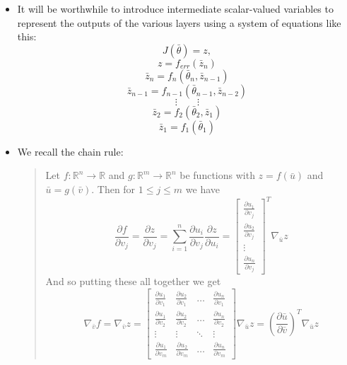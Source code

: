 \documentclass{article}
\begin{document}
\begin{itemize}
\item It will be worthwhile to introduce intermediate scalar-valued variables to represent the outputs of the various layers using a system of equations like this:
$$J(\bar{\theta})  = z,$$
$$ z = f_{err}(\bar{z}_{n})$$ 
$$\bar{z}_{n} = f_{n}(\bar{\theta}_{n}, \bar{z}_{n-1})$$  
$$\bar{z}_{n-1}=  f_{n-1}(\bar{\theta}_{n-1}, \bar{z}_{n-2}) $$ 
$$ \vdots  \qquad \vdots$$
$$  \bar{z}_{2}= f_{2}(\bar{\theta}_{2}, \bar{z}_{1}) $$ 
$$  \bar{z}_{1}= f_{1}(\bar{\theta}_{1}) $$ 

\item We recall the chain rule:
\begin{quote} Let $f:\mathbb{R}^{n} \rightarrow \mathbb{R}$ and $g:\mathbb{R}^{m}\rightarrow \mathbb{R}^{n}$ be functions with $z= f(\bar{u})$ and $\bar{u} = g(\bar{v})$.  Then for
$1 \leq j \leq m$ we have
$$\frac{\partial f}{\partial v_{j}} = \frac{\partial z}{\partial v_{j}} = \sum_{i = 1}^{n} \frac{\partial u_{i}}{\partial v_{j}}\frac{\partial z}{\partial u_{i}} = 
\left[ \begin{array}{c}
\frac{\partial u_{1}}{\partial v_{j}} \\
 \frac{\partial u_{2}}{\partial v_{j}} \\
  \vdots \\
   \frac{\partial u_{n}}{\partial v_{j}} 
   \end{array}\right]^{T} 
   \nabla_{\bar{u}}z$$
And so putting these all together we get
$$\nabla_{\bar{v}}{f} = \nabla_{\bar{v}}{z} =  \left[\begin{array}{cccc}
 \frac{\partial u_{1}}{\partial v_{1}} & \frac{\partial u_{2}}{\partial v_{1}} & \ldots & \frac{\partial u_{n}}{\partial v_{1}}\\
  \frac{\partial u_{1}}{\partial v_{2}} & \frac{\partial u_{2}}{\partial v_{2}} & \ldots & \frac{\partial u_{n}}{\partial v_{2}}\\
   \vdots & \vdots & \ddots & \vdots \\
    \frac{\partial u_{1}}{\partial v_{m}} & \frac{\partial u_{2}}{\partial v_{m}} & \ldots & \frac{\partial u_{n}}{\partial v_{m}}
 \end{array}\right] \nabla_{\bar{u}}z = \left(\frac{\partial \bar{u}}{\partial \bar{v}}\right)^{T} \nabla_{\bar{u}}z$$
 

\end{quote}
\end{itemize}
\end{document}
